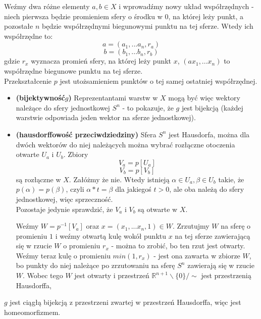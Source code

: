 Weźmy dwa różne elementy $ a, b \in X $ i wprowadźmy nowy układ współrzędnych - niech pierwsza będzie promieniem sfery o środku w $0$, na której leży punkt, a pozostałe $n$ będzie współrzędnymi biegunowymi punktu na tej sferze. Wtedy ich współrzędne to:
$$
a = (a_1, ... a_n, r_a)
$$
$$
b = (b_1, ... b_n, r_b)
$$
gdzie $ r_x $ wyznacza promień sfery, na której leży punkt $ x $, $ (a x_1, ... x_n) $ to współrzędne biegunowe punktu na tej sferze.\\
Przekształcenie $p$ jest utożsamieniem punktów o tej samej ostatniej współrzędnej.
\begin{itemize}
\item \textbf{(bijektywność$g$)} Reprezentantami warstw w $X$ mogą być więc wektory należące do sfery jednostkowej $S^n$ - to pokazuje, że $g$ jest bijekcją (każdej warstwie odpowiada jeden wektor na sferze jednostkowej).
\item \textbf{(hausdorffowość przeciwdziedziny)} Sfera $S^n$ jest Hausdorfa, można dla dwóch wektorów do niej należących można wybrać rozłączne otoczenia otwarte $U_a$ i $U_b$.
Zbiory
$$
V_a = p[U_a]
$$
$$
V_b = p[V_b]
$$
są rozłączne w $X$. Załóżmy że nie. Wtedy istnieją $ \alpha \in U_a, \beta \in U_b $ takie, że $ p(\alpha) = p(\beta) $, czyli $\alpha * t = \beta$ dla jakiegoś $t > 0$, ale oba należą do sfery jednostkowej, więc sprzeczność.\\
Pozostaje jedynie sprawdzić, że $V_a$ i $V_b$ są otwarte w $X$.

Weźmy $ W = p^{-1}[V_a] $ oraz $ x = (x_1, ... x_n, 1) \in W $. Zrzutujmy $W$ na sferę o promieniu $1$ i weźmy otwartą kulę wokół punktu $x$ na tej sferze zawierającą się w rzucie $W$ o promieniu $r_x$ - można to zrobić, bo ten rzut jest otwarty. \\
Weźmy teraz kulę o promieniu $min(1, r_x)$ - jest ona zawarta w zbiorze $W$, bo punkty do niej należące po zrzutowaniu na sferę $S^n$ zawierają się w rzucie $W$. Wobec tego $W$ jest otwarty i przestrzeń  $\mathbb{R}^{n+1} \backslash \{0\} / \sim$  jest przestrzenią Hausdorffa,
\end{itemize}

$g$ jest ciągłą bijekcją z przestrzeni zwartej w przestrzeń Hausdorffa, więc jest homeomorfizmem.
